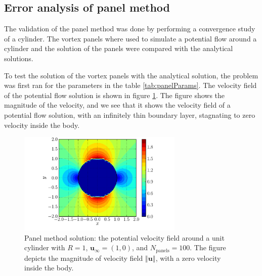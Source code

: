 \subsection{Error analysis of panel method}
The validation of the panel method was done by performing a convergence study of a cylinder. The vortex panels where used to simulate a potential flow around a cylinder and the solution of the panels were compared with the analytical solutions.


To test the solution of the vortex panels with the analytical solution, the problem was first ran for the parameters in the table \ref{tab:panelParams}. The velocity field of the potential flow solution is shown in figure \ref{fig:panelCylinder_velocityField}. The figure shows the magnitude of the velocity, and we see that it shows the velocity field of a potential flow solution, with an infinitely thin boundary layer, stagnating to zero velocity inside the body.

	\begin{figure}[p]
	\centering
	\includegraphics[width=0.7\textwidth]{figures/lagrangian/panelCylinder_velocityField.pdf}
	\caption{Panel method solution: the potential velocity field around a unit cylinder with $R = 1$, $\mathbf{u}_{\infty} = (1, 0)$, and $N_{\mathrm{panels}}=100$. The figure depicts the magnitude of velocity field $\left\Vert\mathbf{u}\right\Vert$, with a zero velocity inside the body.}
	\label{fig:panelCylinder_velocityField}
	\end{figure}

